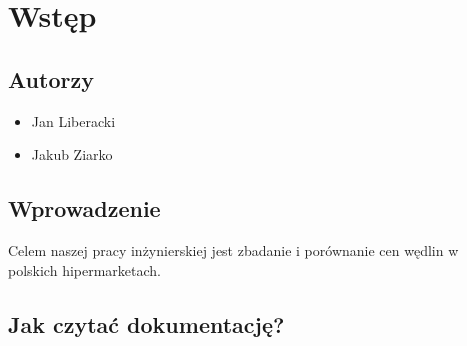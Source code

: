 \section{Wstęp}
 
\subsection{Autorzy}
\begin{itemize}
\item Jan Liberacki
\item Jakub Ziarko
\end{itemize}

\subsection{Wprowadzenie}
Celem naszej pracy inżynierskiej jest zbadanie i porównanie cen wędlin w polskich hipermarketach.

\subsection{Jak czytać dokumentację?}


